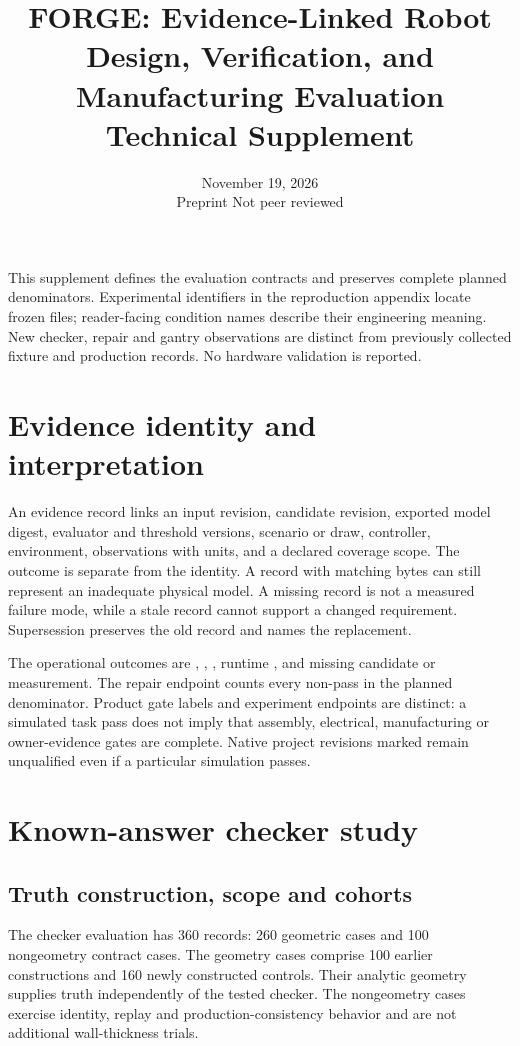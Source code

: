
\title{FORGE: Evidence-Linked Robot Design, Verification, and Manufacturing Evaluation\\\large Technical Supplement}
\author{\authorblock}
\date{November 19, 2026\\\small Preprint \textperiodcentered{} Not peer reviewed}

\maketitle
\noindent This supplement defines the evaluation contracts and preserves complete planned denominators. Experimental identifiers in the reproduction appendix locate frozen files; reader-facing condition names describe their engineering meaning. New checker, repair and gantry observations are distinct from previously collected fixture and production records. No hardware validation is reported.
\tableofcontents

\section{Evidence identity and interpretation}
An evidence record links an input revision, candidate revision, exported model digest, evaluator and threshold versions, scenario or draw, controller, environment, observations with units, and a declared coverage scope. The outcome is separate from the identity. A record with matching bytes can still represent an inadequate physical model. A missing record is not a measured failure mode, while a stale record cannot support a changed requirement. Supersession preserves the old record and names the replacement.

The operational outcomes are , , , runtime , and missing candidate or measurement. The repair endpoint counts every non-pass in the planned denominator. Product gate labels and experiment endpoints are distinct: a simulated task pass does not imply that assembly, electrical, manufacturing or owner-evidence gates are complete. Native project revisions marked  remain unqualified even if a particular simulation passes.

\section{Known-answer checker study}
\subsection{Truth construction, scope and cohorts}
The checker evaluation has 360 records: 260 geometric cases and 100 nongeometry contract cases. The geometry cases comprise 100 earlier constructions and 160 newly constructed controls. Their analytic geometry supplies truth independently of the tested checker. The nongeometry cases exercise identity, replay and production-consistency behavior and are not additional wall-thickness trials.

